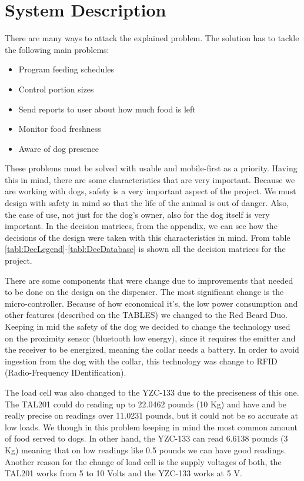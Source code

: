 \documentclass[12pt]{article}
\begin{document}
\section{System Description}

There are many ways to attack the explained problem. The solution has to tackle the following main problems:

\begin{itemize}
  \item Program feeding schedules
  \item Control portion sizes
  \item Send reports to user about how much food is left
  \item Monitor food freshness
  \item Aware of dog presence
\end{itemize}

These problems must be solved with usable and mobile-first as a priority. Having this in mind, there are some characteristics that are very important. Because we are working with dogs, safety is a very important aspect of the project. We must design with safety in mind so that the life of the animal is out of danger. Also, the ease of use, not just for the dog's owner, also for the dog itself is very important. In the decision matrices, from the appendix, we can see how the decisions of the design were taken with this characteristics in mind. From table \ref{tabl:DecLegend}-\ref{tabl:DecDatabase} is shown all the decision matrices for the project.

There are some components that were change due to improvements that needed to be done on the design on the dispenser. The most significant change is the micro-controller. Because of how economical it's, the low power consumption and other features (described on the TABLES) we changed to the Red Beard Duo. Keeping in mid the safety of the dog we decided to change the technology used on the proximity sensor (bluetooth low energy), since it requires the emitter and the receiver to be energized, meaning the collar needs a battery. In order to avoid ingestion from the dog with the collar, this technology was change to RFID (Radio-Frequency IDentification).

The load cell was also changed to the YZC-133 due to the preciseness of this one. The TAL201 could do reading up to 22.0462 pounds (10 Kg) and have and be really precise on readings over 11.0231 pounds, but it could not be so accurate at low loads. We though in this problem keeping in mind the most common amount of food served to dogs. In other hand, the YZC-133 can read 6.6138 pounds (3 Kg) meaning that on low readings like 0.5 pounds we can have good readings. Another reason for the change of load cell is the supply voltages of both, the TAL201 works from 5 to 10 Volts and the YZC-133 works at 5 V.
\end{document}
